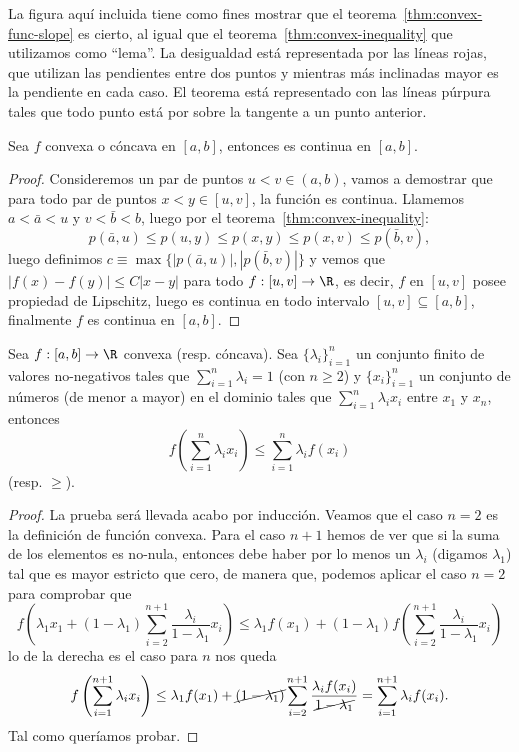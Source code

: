 \documentclass[11pt,oneside,a4paper]{book}
\begin{document}
La figura aquí incluida tiene como fines mostrar que el teorema~\ref{thm:convex-func-slope} es cierto, al igual que el teorema~\ref{thm:convex-inequality} que utilizamos como ``lema''. La desigualdad está representada por las líneas rojas, que utilizan las pendientes entre dos puntos y mientras más inclinadas mayor es la pendiente en cada caso. El teorema está representado con las líneas púrpura tales que todo punto está por sobre la tangente a un punto anterior. 
\begin{thm}
Sea $f$ convexa o cóncava en $[a,b]$, entonces es continua en $[a,b]$.
\end{thm}
\begin{proof}
Consideremos un par de puntos $u\lt v\in(a,b)$, vamos a demostrar que para todo par de puntos $x\lt y\in[u,v]$, la función es continua. Llamemos $a\lt\bar a\lt u$ y $v\lt\bar b\lt b$, luego por el teorema~\ref{thm:convex-inequality}:
$$p(\bar{a},u)\leq p(u,y)\leq p(x,y)\leq p(x,v)\leq p(\bar b,v),$$
luego definimos $c\equiv\max\{|p(\bar a,u)|,|p(\bar b,v)|\}$ y vemos que $|f(x)-f(y)|\leq C|x-y|$ para todo $f:[u,v]\rightarrow\R$, es decir, $f$ en $[u,v]$ posee propiedad de Lipschitz, luego es continua en todo intervalo $[u,v]\subseteq[a,b]$, finalmente $f$ es continua en $[a,b]$.
\end{proof}
\begin{thm}
Sea $f:[a,b]\rightarrow\R$ convexa (resp. cóncava). Sea $\{\lambda_i\}_{i=1}^n$ un conjunto finito de valores no-negativos tales que $\sum_{i=1}^n\lambda_i=1$ (con $n\geq 2$) y $\{x_i\}_{i=1}^n$ un conjunto de números (de menor a mayor) en el dominio tales que $\sum_{i=1}^n \lambda_ix_i$ entre $x_1$ y $x_n$, entonces
$$f\left(\sum_{i=1}^n\lambda_ix_i\right)\leq\sum_{i=1}^n\lambda_if(x_i)$$
(resp. $\geq$).
\end{thm}
\begin{proof}
La prueba será llevada acabo por inducción. Veamos que el caso $n=2$ es la definición de función convexa. Para el caso $n+1$ hemos de ver que si la suma de los elementos es no-nula, entonces debe haber por lo menos un $\lambda_i$ (digamos $\lambda_1$) tal que es mayor estricto que cero, de manera que, podemos aplicar el caso $n=2$ para comprobar que
$$f\left(\lambda_1x_1+(1-\lambda_1)\sum_{i=2}^{n+1}\frac{\lambda_i}{1-\lambda_1}x_i\right)\leq \lambda_1f(x_1)+(1-\lambda_1)f\left(\sum_{i=2}^{n+1}\frac{\lambda_i}{1-\lambda_1}x_i\right)$$
lo de la derecha es el caso para $n$ nos queda
$$f\left(\sum_{i=1}^{n+1}\lambda_ix_i\right)\leq \lambda_1f(x_1)+\cancel{(1-\lambda_1)}\sum_{i=2}^{n+1}\frac{\lambda_if(x_i)}{\cancel{1-\lambda_1}}=\sum_{i=1}^{n+1}\lambda_if(x_i).$$
Tal como queríamos probar.
\end{proof}
\end{document}
